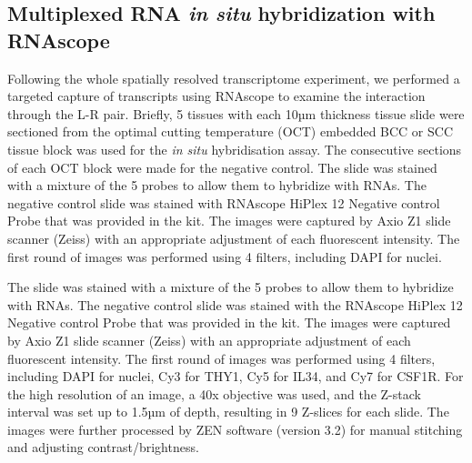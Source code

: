 \subsection{Multiplexed RNA \textit{in situ} hybridization with RNAscope}
Following the whole spatially resolved transcriptome experiment, we performed a targeted capture of transcripts using RNAscope to examine the interaction through the L-R pair. Briefly, 5 tissues with each 10µm thickness tissue slide were sectioned from the optimal cutting temperature (OCT) embedded BCC or SCC tissue block was used for the \textit{in situ} hybridisation assay. The consecutive sections of each OCT block were made for the negative control. The slide was stained with a mixture of the 5 probes to allow them to hybridize with RNAs. The negative control slide was stained with RNAscope HiPlex 12 Negative control Probe that was provided in the kit. The images were captured by Axio Z1 slide scanner (Zeiss) with an appropriate adjustment of each fluorescent intensity. The first round of images was performed using 4 filters, including DAPI for nuclei.

The slide was stained with a mixture of the 5 probes to allow them to hybridize with RNAs. The negative control slide was stained with the RNAscope HiPlex 12 Negative control Probe that was provided in the kit. The images were captured by Axio Z1 slide scanner (Zeiss) with an appropriate adjustment of each fluorescent intensity. The first round of images was performed using 4 filters, including DAPI for nuclei, Cy3 for THY1, Cy5 for IL34, and Cy7 for CSF1R. For the high resolution of an image, a 40x objective was used, and the Z-stack interval was set up to 1.5µm of depth, resulting in 9 Z-slices for each slide. The images were further processed by ZEN software (version 3.2) for manual stitching and adjusting contrast/brightness.

